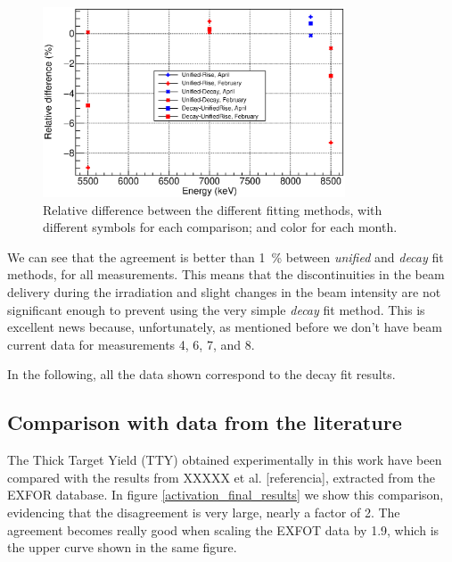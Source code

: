 \documentclass[a4paper,12pt]{report}
\begin{document}
\begin{figure}[H]
	\centering
	\includegraphics[width=0.80\textwidth]{activation_method_comparison.eps}	%
	\caption{Relative difference between the different fitting methods, with different symbols for each comparison; and color for each month.}
	\label{activation_method_comparison}
\end{figure}

We can see that the agreement is better than \qty{1}{\percent} between \textit{unified} and \textit{decay} fit methods, for all measurements.
This means that the discontinuities in the beam delivery during the irradiation and slight changes in the beam intensity are not significant enough to prevent using the very simple \textit{decay} fit method.
This is excellent news because, unfortunately, as mentioned before we don't have beam current data for measurements 4, 6, 7, and 8.

In the following, all the data shown correspond to the decay fit results.
\\

\subsection{Comparison with data from the literature}
The Thick Target Yield (TTY) obtained experimentally in this work have been compared with the results from XXXXX et al. [referencia], extracted from the EXFOR database. %
In figure \ref{activation_final_results} we show this comparison, evidencing that the disagreement is very large, nearly a factor of \num{2}.
The agreement becomes really good when scaling the EXFOT data by 1.9, which is the upper curve shown in the same figure.
\end{document}
